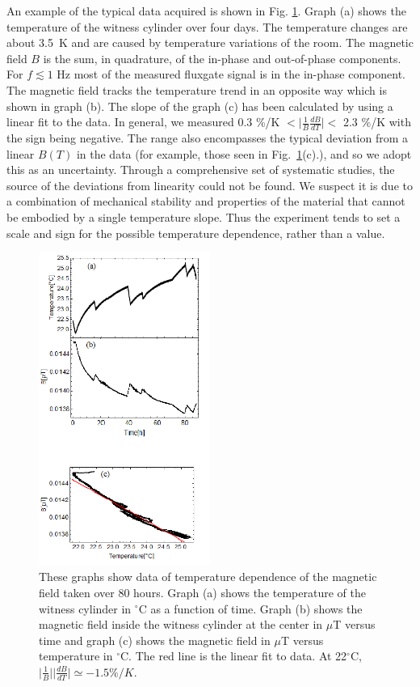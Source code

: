 \documentclass[review]{elsarticle}
\begin{document}
An example of the typical data acquired is shown in
Fig. \ref{fig:B_vs_Temp}. Graph (a) shows the temperature of the
witness cylinder over four days. The temperature changes are about
3.5~K and are caused by temperature variations of the room. The
magnetic field $B$ is the sum, in quadrature, of the in-phase and
out-of-phase components. For $f\lesssim 1$ Hz most of the measured
fluxgate signal is in the in-phase component. The magnetic field
tracks the temperature trend in an opposite way which is shown in
graph (b). The slope of the graph (c) has been calculated by using a
linear fit to the data. In general, we measured 0.3 \%/K $< \vert
\frac{1}{B} \frac{dB}{dT} \vert <$ 2.3 \%/K with the sign being
negative. The range also encompasses the typical deviation from a
linear $B(T)$ in the data (for example, those seen in
Fig.~\ref{fig:B_vs_Temp}(c).), and so we adopt this as an
uncertainty. Through a comprehensive set of systematic studies, the
source of the deviations from linearity could not be found. We suspect
it is due to a combination of mechanical stability and properties of
the material that cannot be embodied by a single temperature
slope. Thus the experiment tends to set a scale and sign for the
possible temperature dependence, rather than a value.
  \begin{figure}[h!]
\begin{center}
   \includegraphics[width=0.5\textwidth]{B_vs_T.png}
    \caption{These graphs show data of temperature dependence of the
      magnetic field taken over 80 hours. Graph (a) shows the
      temperature of the witness cylinder in $^\circ$C as a function
      of time. Graph (b) shows the magnetic field inside the witness
      cylinder at the center in $\mu$T versus time and graph (c) shows
      the magnetic field in $\mu$T versus temperature in
      $^\circ$C. The red line is the linear fit to data. At
      22$^\circ$C, $\vert \frac{1}{B}\vert \vert
      \frac{dB}{dT}\vert\simeq -1.5 \% /K.$ }
    \label{fig:B_vs_Temp}
     \vspace{-2.em}
    \end{center}
\end{figure} 
\end{document}
